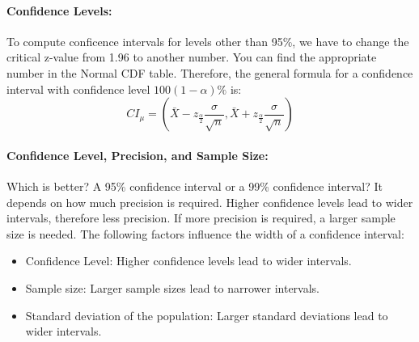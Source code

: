 \paragraph*{Confidence Levels:}
To compute conficence intervals for levels other than 95\%, we have to change the critical z-value from 1.96 to 
another number. You can find the appropriate number in the Normal CDF table. Therefore, the general formula for a
confidence interval with confidence level $100(1 - \alpha)\%$ is:
\[
    CI_\mu = (\bar{X} - z_\frac{\alpha}{2}\frac{\sigma}{\sqrt{n}}, \bar{X} + z_\frac{\alpha}{2}\frac{\sigma}{\sqrt{n}})
\]

\paragraph*{Confidence Level, Precision, and Sample Size:}
Which is better? A 95\% confidence interval or a 99\% confidence interval? It depends on how much precision is required. 
Higher confidence levels lead to wider intervals, therefore less precision. If more precision is required, a larger sample size is needed.
The following factors influence the width of a confidence interval:
\begin{itemize}
    \item Confidence Level: Higher confidence levels lead to wider intervals.
    \item Sample size: Larger sample sizes lead to narrower intervals.
    \item Standard deviation of the population: Larger standard deviations lead to wider intervals.
\end{itemize}